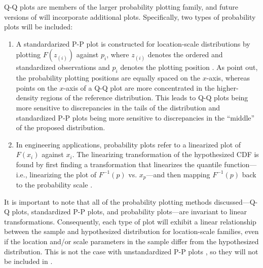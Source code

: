Q-Q plots are members of the larger probability plotting family, and
future versions of  will incorporate additional plots.
Specifically, two types of probability plots will be included:

\begin{enumerate}
\def\labelenumi{\arabic{enumi}.}
\tightlist
\item
  A standardarized P-P plot is constructed for location-scale
  distributions by plotting \(F(z_{(i)})\) against \(p_i\), where
  \(z_{(i)}\) denotes the ordered and standardized observations and
  \(p_i\) denotes the plotting position \citep{Gan1991-yk}. As
  \citet{Gan1991-yk} point out, the probability plotting positions are
  equally spaced on the \(x\)-axis, whereas points on the \(x\)-axis of
  a Q-Q plot are more concentrated in the higher-density regions of the
  reference distribution. This leads to Q-Q plots being more sensitive
  to discrepancies in the tails of the distribution and standardized P-P
  plots being more sensitive to discrepancies in the ``middle'' of the
  proposed distribution.
\item
  In engineering applications, probability plots refer to a linearized
  plot of \(F(x_i)\) against \(x_i\). The linearizing transformation of
  the hypothesized CDF is found by first finding a transformation that
  linearizes the quantile function---i.e., linearizing the plot of
  \(F^{-1}(p)\) vs. \(x_p\)---and then mapping \(F^{-1}(p)\) back to the
  probability scale \citep[cf.][Chapter 6]{Meeker1998}.
\end{enumerate}

It is important to note that all of the probability plotting methods
discussed---Q-Q plots, standardized P-P plots, and probability
plots---are invariant to linear transformations. Consequently, each type
of plot will exhibit a linear relationship between the sample and
hypothesized distribution for location-scale families, even if the
location and/or scale parameters in the sample differ from the
hypothesized distribution. This is not the case with unstandardized P-P
plots \citep{Wilk1968-ii}, so they will not be included in
.

